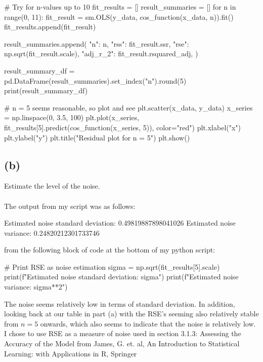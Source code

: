 \documentclass{article}
\begin{document}
{\begin{spverbatim}
# Try for n-values up to 10
fit_results = []
result_summaries = []
for n in range(0, 11):
  fit_result = sm.OLS(y_data, cos_function(x_data, n)).fit()
  fit_results.append(fit_result)

  result_summaries.append({
    "n": n,
    "rss": fit_result.ssr,
    "rse": np.sqrt(fit_result.scale),
    "adj_r_2": fit_result.rsquared_adj,
  })

result_summary_df = pd.DataFrame(result_summaries).set_index("n").round(5)
print(result_summary_df)

# n = 5 seems reasonable, so plot and see
plt.scatter(x_data, y_data)
x_series = np.linspace(0, 3.5, 100)
plt.plot(x_series, fit_results[5].predict(cos_function(x_series, 5)), color="red")
plt.xlabel("x")
plt.ylabel("y")
plt.title("Residual plot for n = 5")
plt.show()
\end{spverbatim}

\subsection*{(b)}
Estimate the level of the noise. \\ \\
The output from my script was as follows:
\begin{spverbatim}
Estimated noise standard deviation: 0.49819887898041026
Estimated noise variance: 0.24820212301733746
\end{spverbatim}
from the following block of code at the bottom of my python script:
\begin{spverbatim}
# Print RSE as noise estimation 
sigma = np.sqrt(fit_results[5].scale)
print(f"Estimated noise standard deviation: {sigma}")
print(f"Estimated noise variance: {sigma**2}")
\end{spverbatim}
The noise seems relatively low in terms of standard deviation. In addition, looking back at our table in part (a) with the RSE's seeming also relatively stable from \(n=5\) onwards, which also seems to indicate that the noise is relatively low. I chose to use RSE as a measure of noise used in section 3.1.3: Assessing the Accuracy of the Model from James, G. et. al, An Introduction to Statistical Learning: with Applications in R, Springer

}
\end{document}
